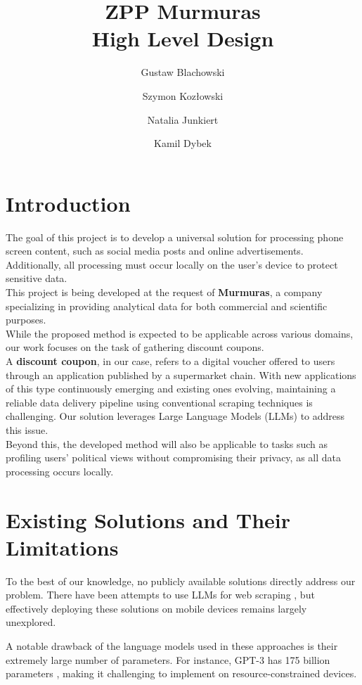 \documentclass[12pt]{article}
\title{ZPP Murmuras\\ High Level Design}
\author{Gustaw Blachowski \and Szymon Kozłowski \and Natalia Junkiert \and Kamil Dybek}
\date{}
\begin{document}
\maketitle

\section*{Introduction}
The goal of this project is to develop a universal solution for processing phone screen content, such as social media posts and online advertisements. Additionally, all processing must occur locally on the user's device to protect sensitive data.\\

This project is being developed at the request of \textbf{Murmuras}\cite{murmuras}, a company specializing in providing analytical data for both commercial and scientific purposes.\\

While the proposed method is expected to be applicable across various domains, our work focuses on the task of gathering discount coupons.\\

A \textbf{discount coupon}, in our case, refers to a digital voucher offered to users through an application published by a supermarket chain. With new applications of this type continuously emerging and existing ones evolving, maintaining a reliable data delivery pipeline using conventional scraping techniques is challenging. Our solution leverages Large Language Models (LLMs) to address this issue.\\

Beyond this, the developed method will also be applicable to tasks such as profiling users' political views without compromising their privacy, as all data processing occurs locally.


\section*{Existing Solutions and Their Limitations}
To the best of our knowledge, no publicly available solutions directly address our problem. There have been attempts to use LLMs for web scraping \cite{scrapegraph-ai}\cite{llm-reader}, but effectively deploying these solutions on mobile devices remains largely unexplored.

A notable drawback of the language models used in these approaches is their extremely large number of parameters. For instance, GPT-3 has 175 billion parameters \cite{brown2020languagemodelsfewshotlearners}, making it challenging to implement on resource-constrained devices.
\end{document}
